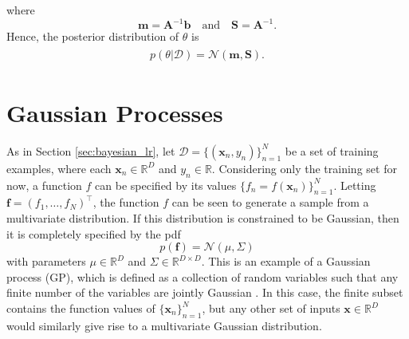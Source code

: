 \documentclass[msc,deptreport.inf]{infthesis} %
\newcommand{\matr}[1]{\mathbf{#1}}
\newcommand{\R}{\mathbb R}
\begin{document}
where
\begin{equation}\label{eqn:linear_regression_posterior_params}
	\matr{m} = \matr{A}^{-1} \matr{b}
	\quad \text{and} \quad 
	\matr{S} = \matr{A}^{-1}.
\end{equation}
Hence, the posterior distribution of $\theta$ is 
\begin{align}\label{eqn:linear_regression_posterior}
\begin{split}
	p(\theta | \mathcal{D}) = \mathcal{N}(\matr{m}, \matr{S}).
\end{split}
\end{align}


\section{Gaussian Processes}\label{sec:gps}

%

As in Section \ref{sec:bayesian_lr}, let $\mathcal{D} = \{(\matr{x}_n, y_n)\}_{n=1}^{N}$ be a set of training examples, where each $\matr{x}_n \in \R^D$ and $y_n \in \R$. Considering only the training set for now, a function $f$ can be specified by its values $\{f_n =  f(\matr{x}_n)\}_{n=1}^{N}$. Letting $\matr{f} = (f_1, \dots, f_N)^\intercal$, the function $f$ can be seen to generate a sample from a multivariate distribution. If this distribution is constrained to be Gaussian, then it is completely specified by the pdf
\begin{equation}
	p(\matr{f}) = \mathcal{N}(\mu, \Sigma)
\end{equation}
with parameters $\mu \in \R^D$ and $\Sigma \in \R^{D \times D}$. This is an example of a Gaussian process (GP), which is defined as a collection of random variables such that any finite number of the variables are jointly Gaussian \cite{rasmussen2006}. In this case, the finite subset contains the function values of $\{\matr{x}_n\}_{n=1}^{N}$, but any other set of inputs $\matr{x} \in \R^D$ would similarly give rise to a multivariate Gaussian distribution. 
\end{document}
